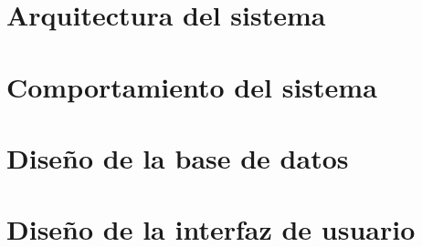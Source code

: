 \section{Arquitectura del sistema}
\label{arquitectura_sistema}


\section{Comportamiento del sistema}
\label{comportamiento_sistema}

\section{Diseño de la base de datos}
\label{diseno_base_datos}

\section{Diseño de la interfaz de usuario}
